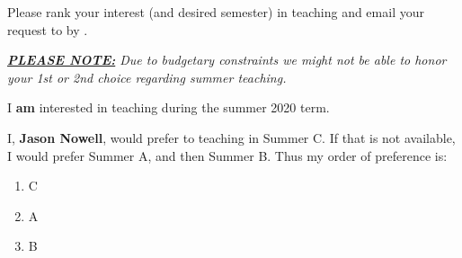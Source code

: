 \documentclass{article}
\newcommand{\choice}[4]{


    I, \textbf{#1}, would prefer to teaching in Summer #2. If that is not available, I would prefer Summer #3, and then Summer #4. Thus my order of preference is:

    \begin{enumerate}
        \item #2
        \item #3
        \item #4
    \end{enumerate}
   
}
\newcommand{\nochoice}[1]{
    I, \textbf{#1}, \textbf{request no teaching assignment}. I also realize this means I will have no tuition wavier if I decide to enroll in summer courses, and I will also not be receiving a stipend (for teaching duties) during this summer. This does not necessarily impact any scholarships or non-teaching stipends I might otherwise receive.
}
\begin{document}
Please rank your interest (and desired semester) in teaching and email your request to \dueRecipient by \dueDate.


\textit{\underline{\textbf{PLEASE NOTE:}} Due to budgetary constraints we might not be able to honor your 1st or
2nd choice regarding summer teaching.}

\vspace{2cm}

I \textbf{am} interested in teaching during the summer 2020 term.

\vspace{2cm}




\choice{Jason Nowell}{C}{A}{B}
\end{document}
